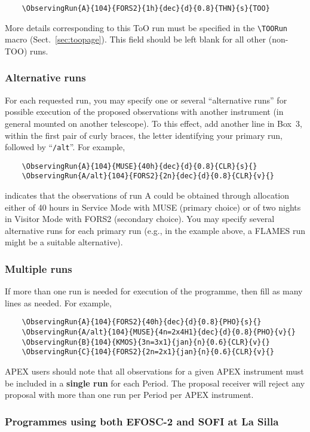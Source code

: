 \documentclass{article}
\begin{document}
\begin{verbatim}
    \ObservingRun{A}{104}{FORS2}{1h}{dec}{d}{0.8}{THN}{s}{TOO}
\end{verbatim}

More details corresponding to this ToO run must be specified in the
\verb|\TOORun| macro (Sect.~\ref{sec:toopage}).
This field should be left blank for all other (non-TOO) runs.

\subsubsection*{Alternative runs}
For each requested run, you may specify one or several
``alternative runs'' for possible execution of the proposed
observations with another instrument (in general mounted on another
telescope). To this effect, add another line in Box~3, within the
first pair of curly braces, the letter identifying your primary run,
followed by ``\verb|/alt|''. For example,
\begin{verbatim}
    \ObservingRun{A}{104}{MUSE}{40h}{dec}{d}{0.8}{CLR}{s}{}
    \ObservingRun{A/alt}{104}{FORS2}{2n}{dec}{d}{0.8}{CLR}{v}{}
\end{verbatim}
indicates that the observations of run A could be obtained
through allocation either of 40 hours in Service Mode with MUSE
(primary choice) or of two nights in Visitor Mode with FORS2 (secondary
choice). You may specify several alternative runs for each primary run
(e.g., in the example above, a FLAMES run might be a suitable alternative).

\subsubsection*{Multiple runs}
If more than one run is needed for execution of
the programme, then fill as many lines as needed.  For example,
\begin{verbatim} 
    \ObservingRun{A}{104}{FORS2}{40h}{dec}{d}{0.8}{PHO}{s}{}
    \ObservingRun{A/alt}{104}{MUSE}{4n=2x4H1}{dec}{d}{0.8}{PHO}{v}{}
    \ObservingRun{B}{104}{KMOS}{3n=3x1}{jan}{n}{0.6}{CLR}{v}{}
    \ObservingRun{C}{104}{FORS2}{2n=2x1}{jan}{n}{0.6}{CLR}{v}{}
\end{verbatim}

APEX users should note that all observations for a given APEX
instrument must be included in a {\bf single run} for each Period. The proposal
receiver will reject any proposal with more than one run per Period per APEX instrument. 

\subsubsection*{Programmes using both EFOSC-2 and SOFI at La Silla}
\label{sec:sofiefosc}
\end{document}

